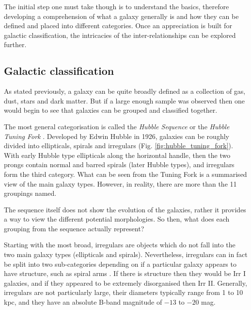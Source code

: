 \documentclass[12pt, twocolumn]{revtex4}    %
\begin{document}
The initial step one must take though is to understand the basics, therefore developing a comprehension of what a galaxy generally is and how they can be defined and placed into different categories. Once an appreciation is built for galactic classification, the intricacies of the inter-relationships can be explored further. 


\subsection{Galactic classification}

As stated previously, a galaxy can be quite broadly defined as a collection of gas, dust, stars and dark matter. But if a large enough sample was observed then one would begin to see that galaxies can be grouped and classified together.

The most general categorisation is called the \textit{Hubble Sequence} or the \textit{Hubble Tuning Fork} \citep{carroll_astro}. Developed by Edwin Hubble in 1926, galaxies can be roughly divided into ellipticals, spirals and irregulars (Fig. \ref{fig:hubble_tuning_fork}). With early Hubble type ellipticals along the horizontal handle, then the two prongs contain normal and barred spirals (later Hubble types), and irregulars form the third category. What can be seen from the Tuning Fork is a summarised view of the main galaxy types. However, in reality, there are more than the 11 groupings named.

The sequence itself does not show the evolution of the galaxies, rather it provides a way to view the different potential morphologies. So then, what does each grouping from the sequence actually represent? 

Starting with the most broad, irregulars are objects which do not fall into the two main galaxy types (ellipticals and spirals). Nevertheless, irregulars can in fact be split into two sub-categories depending on if a particular galaxy appears to have structure, such as spiral arms \citep{carroll_astro}. If there is structure then they would be Irr I galaxies, and if they appeared to be extremely disorganised then Irr II. Generally, irregulars are not particularly large, their diameters typically range from 1 to 10 kpc, and they have an absolute B-band magnitude of $-13$ to $-20$ mag.

\end{document}
